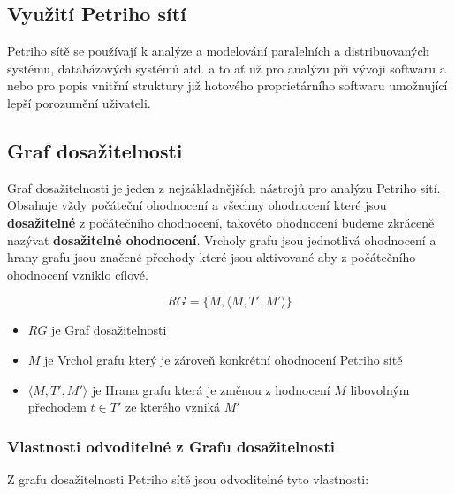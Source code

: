 \documentclass[
  biblatex,
  glossaries,
  printversion
]{kidiplom}
\begin{document}
\subsection{Využití Petriho sítí}

Petriho sítě se používají k analýze a modelování paralelních
a distribuovaných systému, databázových systémů atd. a to ať už
pro analýzu při vývoji softwaru a nebo pro popis vnitřní struktury
již hotového proprietárního softwaru umožnující lepší porozumění uživateli.


\subsection{Graf dosažitelnosti}

Graf dosažitelnosti je jeden z nejzákladnějších nástrojů pro analýzu Petriho sítí.
Obsahuje vždy počáteční ohodnocení a všechny ohodnocení které jsou \textbf{dosažitelné} z počátečního ohodnocení, 
takovéto ohodnocení budeme zkráceně nazývat \textbf{dosažitelné ohodnocení}. 
Vrcholy grafu jsou jednotlivá ohodnocení
a hrany grafu jsou značené přechody které jsou aktivované aby z počátečního ohodnocení vzniklo cílové.

\begin{definition}
  $$RG = \{M, \langle M, T', M' \rangle\}$$
  \begin{itemize}
    \item $RG$ je Graf dosažitelnosti
    \item $M$ je Vrchol grafu který je zároveň konkrétní ohodnocení Petriho sítě
    \item $\langle M, T', M' \rangle$ je Hrana grafu která je změnou z hodnocení $M$ libovolným přechodem $t \in T'$ ze kterého vzniká $M'$
  \end{itemize}
\end{definition}

\subsubsection{Vlastnosti odvoditelné z Grafu dosažitelnosti}
Z grafu dosažitelnosti Petriho sítě jsou odvoditelné tyto vlastnosti:
\end{document}
